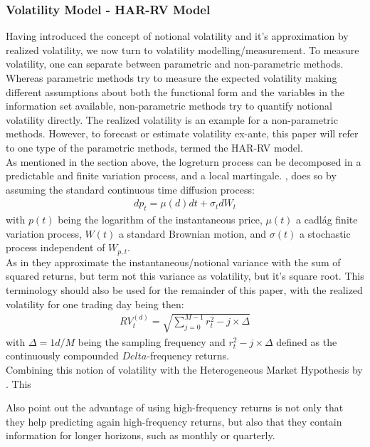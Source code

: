 \subsubsection{Volatility Model - HAR-RV Model}
Having introduced the concept of notional volatility and it's approximation by realized volatility, we now turn to volatility modelling/measurement. To measure volatility, one can separate between parametric and non-parametric methods. Whereas parametric methods try to measure the expected volatility making different assumptions about both the functional form and the variables in the information set available, non-parametric methods try to quantify notional volatility directly. The realized volatility is an example for a non-parametric methods. However, to forecast or estimate volatility ex-ante, this paper will refer to one type of the parametric methods, termed the HAR-RV model.\\
As mentioned in the section above, the logreturn process can be decomposed in a predictable and finite variation process, and a local martingale. \citeauthor{corsi2009}, does so by assuming the standard continuous time diffusion process:
\begin{align}\label{eq:return-process-corsi}
dp_{t} = \mu (d) dt + \sigma_{t} dW_{t}
\end{align}
with $p(t)$ being the logarithm of the instantaneous price, $\mu (t)$ a cadlág finite variation process, $W (t)$ a standard Brownian motion, and $\sigma (t)$ a stochastic process independent of $W_{p,t}$.\\
As in \citeauthor{andersen2001} they approximate the instantaneous/notional variance with the sum of squared returns, but term not this variance as volatility, but it's square root. This terminology should also be used for the remainder of this paper, with the realized volatility for one trading day being then:
\begin{align}
RV_{t}^{(d)} = \sqrt{\sum_{j=0}^{M-1} r^{2}_t-j \times \Delta}
\end{align}
with $\Delta = 1d/M$ being the sampling frequency and $r^{2}_t-j \times \Delta$ defined as the continuously compounded $Delta$-frequency returns. \\
Combining this notion of volatility with the Heterogeneous Market Hypothesis by \citeauthor{mueller1993}. This 



Also \citeauthor{andersen2003} point out the advantage of using high-frequency returns is not only that they help predicting again high-frequency returns, but also that they contain information for longer horizons, such as monthly or quarterly. 


